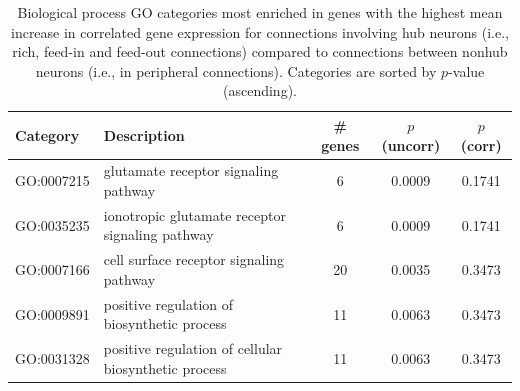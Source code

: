 \documentclass[10pt,letterpaper]{article}
\begin{document}
{\begin{table}[]
\begin{adjustwidth}{-2.25in}{}
\centering
\caption{
Biological process GO categories most enriched in genes with the highest mean increase in correlated gene expression for connections involving hub neurons (i.e., rich, feed-in and feed-out connections) compared to connections between nonhub neurons (i.e., in peripheral connections).
Categories are sorted by $p$-value (ascending).
}
\label{tab:enrichmentRICH}
\begin{tabular}{llccc}
\hline
\textbf{Category} & \textbf{Description}                                                                                               &  \textbf{\# genes} & \textbf{$p$ (uncorr)}                                                                                                                                      & \textbf{$p$ (corr)} \\ \hline
GO:0007215          & glutamate receptor signaling pathway                                                                               & 6                                                      & 0.0009                                               & 0.1741                                             \\
GO:0035235          & ionotropic glutamate receptor signaling pathway                        & 6                                                      & 0.0009                                               & 0.1741                                             \\
GO:0007166          & cell surface receptor signaling pathway                                                                            & 20                                                     & 0.0035                                               & 0.3473                                             \\
GO:0009891          & positive regulation of biosynthetic process                                                                        & 11                                                     & 0.0063                                               & 0.3473                                             \\
GO:0031328          & positive regulation of cellular biosynthetic process                   & 11                                                     & 0.0063                                               & 0.3473                                             \\

\end{tabular}
\end{adjustwidth}
\end{table}}
\end{document}
